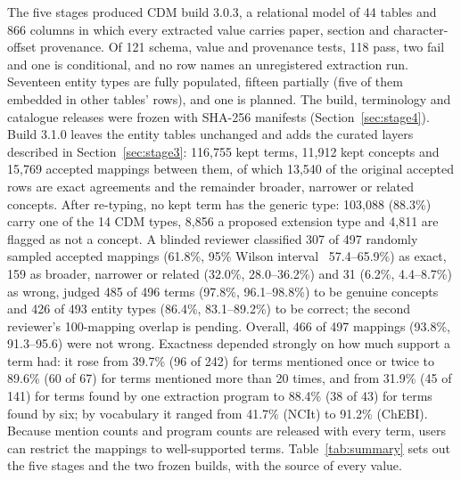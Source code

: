 \documentclass[referee,lineno,pdflatex,sn-vancouver-num]{sn-jnl}
\theoremstyle{thmstyleone}%
\theoremstyle{thmstyletwo}%
\theoremstyle{thmstylethree}%
\begin{document}
The five stages produced CDM build 3.0.3, a relational model of 44
tables and 866 columns in which every extracted value carries paper,
section and character-offset provenance. Of 121 schema, value and
provenance tests, 118 pass, two fail and one is conditional, and no row
names an unregistered extraction run. Seventeen entity types are
fully populated, fifteen partially (five of them embedded in other
tables' rows), and one is planned. The build, terminology and
catalogue releases were frozen with SHA-256 manifests
(Section~\ref{sec:stage4}). Build 3.1.0 leaves the entity tables unchanged and
adds the curated layers described in Section~\ref{sec:stage3}: 116,755 kept
terms, 11,912 kept concepts and 15,769 accepted mappings between them, of
which 13,540 of the original accepted rows are exact agreements and the
remainder broader, narrower or related concepts. After re-typing, no kept
term has the generic type: 103,088 (88.3\%) carry one of the 14 CDM types,
8,856 a proposed extension type and 4,811 are flagged as not a concept.
A blinded reviewer
classified 307 of 497 randomly sampled accepted mappings (61.8\%, 95\%
Wilson interval~\cite{wilson1927} 57.4--65.9\%) as exact, 159 as broader, narrower or related
(32.0\%, 28.0--36.2\%) and 31 (6.2\%, 4.4--8.7\%) as wrong, judged 485 of
496 terms (97.8\%, 96.1--98.8\%) to be genuine concepts and 426 of 493
entity types (86.4\%, 83.1--89.2\%) to be correct; the second reviewer's
100-mapping overlap is pending. Overall, 466 of 497 mappings (93.8\%,
91.3--95.6) were not wrong. Exactness depended strongly on how much support a
term had: it rose from 39.7\% (96 of 242) for terms mentioned once or twice to
89.6\% (60 of 67) for terms mentioned more than 20 times, and from 31.9\% (45 of
141) for terms found by one extraction program to 88.4\% (38 of 43) for terms
found by six; by vocabulary it ranged from 41.7\% (NCIt) to 91.2\% (ChEBI).
Because mention counts and program counts are released with every term, users
can restrict the mappings to well-supported terms. Table~\ref{tab:summary} sets
out the five stages and the two frozen builds, with the source of every value.
\end{document}

